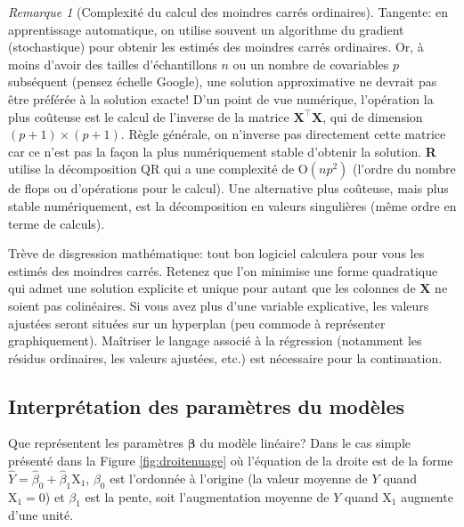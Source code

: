 \documentclass[
  11pt,
  letterpaper,
]{article}
\theoremstyle{definition}
\theoremstyle{definition}
\theoremstyle{definition}
\theoremstyle{definition}
\theoremstyle{remark}
\newtheorem*{remark}{Remarque}
\begin{document}
\begin{remark}[Complexité du calcul des moindres carrés ordinaires]
Tangente: en apprentissage automatique, on utilise souvent un algorithme du gradient (stochastique) pour obtenir les estimés des moindres carrés ordinaires. Or, à moins d'avoir des tailles d'échantillons \(n\) ou un nombre de covariables \(p\) subséquent (pensez échelle Google), une solution approximative ne devrait pas être préférée à la solution exacte! D'un point de vue numérique, l'opération la plus coûteuse est le calcul de l'inverse de la matrice \(\mathbf{X}^\top\mathbf{X}\), qui de dimension \((p+1) \times (p+1)\). Règle générale, on n'inverse pas directement cette matrice car ce n'est pas la façon la plus numériquement stable d'obtenir la solution. \textbf{R} utilise la décomposition QR qui a une complexité de \(\mathrm{O}(np^2)\) (l'ordre du nombre de flops ou d'opérations pour le calcul). Une alternative plus coûteuse, mais plus stable numériquement, est la décomposition en valeurs singulières (même ordre en terme de calculs).
\end{remark}

Trève de disgression mathématique: tout bon logiciel calculera pour vous les estimés des moindres carrés. Retenez que l'on minimise une forme quadratique qui admet une solution explicite et unique pour autant que les colonnes de \(\mathbf{X}\) ne soient pas colinéaires. Si vous avez plus d'une variable explicative, les valeurs ajustées seront situées sur un hyperplan (peu commode à représenter graphiquement). Maîtriser le langage associé à la régression (notamment les résidus ordinaires, les valeurs ajustées, etc.) est nécessaire pour la continuation.

\hypertarget{interpruxe9tation-des-paramuxe8tres-du-moduxe8les}{%
\subsection{Interprétation des paramètres du modèles}\label{interpruxe9tation-des-paramuxe8tres-du-moduxe8les}}

Que représentent les paramètres \(\boldsymbol{\beta}\) du modèle linéaire? Dans le cas simple présenté dans la Figure \ref{fig:droitenuage} où l'équation de la droite est de la forme \(\widehat{Y} = \widehat{\beta}_0 + \widehat{\beta}_1\mathrm{X}_1\), \(\beta_0\) est l'ordonnée à l'origine (la valeur moyenne de \(Y\) quand \(\mathrm{X}_1=0\)) et \(\beta_1\) est la pente, soit l'augmentation moyenne de \(Y\) quand \(\mathrm{X}_1\) augmente d'une unité.
\end{document}

